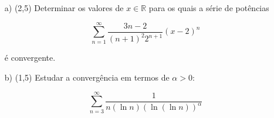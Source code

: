 \documentclass[12pt,a4paper]{article}
\begin{document}

\newpage
{}
\begin{itemize}
\item[a)] (2,5) Determinar os valores de $x \in \mathbb{R}$ para os quais a série de potências

$$ \sum_{n=1}^\infty \frac{3n-2}{(n+1)^2 2^{n+1}} (x-2)^n $$

é convergente.

\item[b)] (1,5) Estudar a convergência em termos de $\alpha > 0$:

$$ \sum_{n=3}^\infty \frac{1}{n (\ln n)(\ln (\ln n))^\alpha} $$

\end{itemize}


\\
\end{document}
